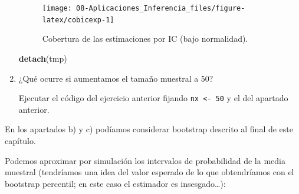 \documentclass[]{book}
\newenvironment{Shaded}{\begin{snugshade}}{\end{snugshade}}
\newcommand{\KeywordTok}[1]{\textcolor[rgb]{0.13,0.29,0.53}{\textbf{#1}}}
\newcommand{\NormalTok}[1]{#1}
\theoremstyle{definition}
\theoremstyle{definition}
\theoremstyle{definition}
\theoremstyle{remark}
\begin{document}
\begin{enumerate}
  \begin{figure}[!htb]

  {\centering \texttt{[image: 08-Aplicaciones\_Inferencia\_files/figure-latex/cobicexp-1]} 

  }

  \caption{Cobertura de las estimaciones por IC (bajo normalidad).}\label{fig:cobicexp}
  \end{figure}

\begin{Shaded}
\begin{Highlighting}[]
\KeywordTok{detach}\NormalTok{(tmp)}
\end{Highlighting}
\end{Shaded}
\item
  ¿Qué ocurre si aumentamos el tamaño muestral a 50?

  Ejecutar el código del ejercicio anterior fijando
  \texttt{nx\ \textless{}-\ 50} y el del apartado anterior.
\end{enumerate}

En los apartados b) y c) podíamos considerar bootstrap descrito al final
de este capítulo.

Podemos aproximar por simulación los intervalos de probabilidad de la
media muestral (tendríamos una idea del valor esperado de lo que
obtendríamos con el bootstrap percentil; en este caso el estimador es
insesgado\ldots{}):
\end{document}
